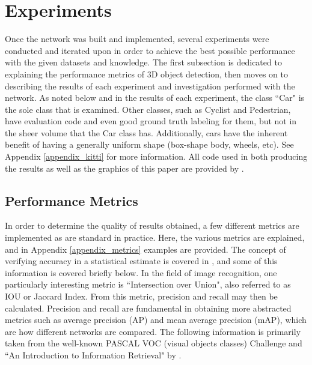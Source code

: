 \section{Experiments}
\label{sect_experiments}
Once the network was built and implemented, several experiments were conducted and iterated upon in order to achieve the best possible performance with the given datasets and knowledge. The first subsection is dedicated to explaining the performance metrics of 3D object detection, then moves on to describing the results of each experiment and investigation performed with the network. As noted below and in the results of each experiment, the class ``Car" is the sole class that is examined. Other classes, such as Cyclist and Pedestrian, have evaluation code and even good ground truth labeling for them, but not in the sheer volume that the Car class has. Additionally, cars have the inherent benefit of having a generally uniform shape (box-shape body, wheels, etc). See Appendix \ref{appendix_kitti} for more information. All code used in both producing the results as well as the graphics of this paper are provided by \cite{gonzalez_smart3d_2019}. 

\subsection{Performance Metrics}
In order to determine the quality of results obtained, a few different metrics are implemented as are standard in practice. Here, the various metrics are explained, and in Appendix \ref{appendix_metrics} examples are provided. The concept of verifying accuracy in a statistical estimate is covered in \cite{manning_introduction_2008}, and some of this information is covered briefly below. In the field of image recognition, one particularly interesting metric is ``Intersection over Union", also referred to as IOU or Jaccard Index. From this metric, precision and recall may then be calculated. Precision and recall are fundamental in obtaining more abstracted metrics such as average precision (AP) and mean average precision (mAP), which are how different networks are compared. The following information is primarily taken from the well-known PASCAL VOC (visual objects classes) Challenge \cite{everingham_pascal_2010} and ``An Introduction to Information Retrieval" by \cite{manning_introduction_2008}.

